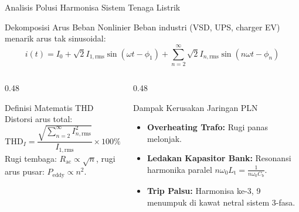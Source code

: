 \documentclass[aspectratio=169,10pt]{beamer}
\begin{document}
\begin{frame}{Analisis Polusi Harmonisa Sistem Tenaga Listrik}
  \begin{block}{Dekomposisi Arus Beban Nonlinier}
    \small
    Beban industri (VSD, UPS, charger EV) menarik arus tak sinusoidal:
    \begin{equation*}
      i(t) = I_0 + \sqrt{2} I_{1,\text{rms}} \sin(\omega t - \phi_1) + \sum_{n=2}^{\infty} \sqrt{2} I_{n,\text{rms}} \sin(n\omega t - \phi_n)
    \end{equation*}
  \end{block}
  \begin{columns}[t]
    \begin{column}{0.48\textwidth}
      \begin{alertblock}{Definisi Matematis THD}
        \small
        Distorsi arus total:
        \begin{equation*}
          \text{THD}_I = \frac{\sqrt{\sum_{n=2}^{\infty} I_{n,\text{rms}}^2}}{I_{1,\text{rms}}} \times 100\%
        \end{equation*}
        Rugi tembaga: $R_{\text{ac}} \propto \sqrt{n}$, rugi arus pusar: $P_{\text{eddy}} \propto n^2$.
      \end{alertblock}
    \end{column}
    \begin{column}{0.48\textwidth}
      \begin{exampleblock}{Dampak Kerusakan Jaringan PLN}
        \small
        \begin{itemize}
          \item \textbf{Overheating Trafo:} Rugi panas melonjak.
          \item \textbf{Ledakan Kapasitor Bank:} Resonansi harmonika paralel $n \omega_0 L_{\text{t}} = \frac{1}{n \omega_0 C_{\text{b}}}$.
          \item \textbf{Trip Palsu:} Harmonisa ke-3, 9 menumpuk di kawat netral sistem 3-fasa.
        \end{itemize}
      \end{exampleblock}
    \end{column}
  \end{columns}
\end{frame}
\end{document}
